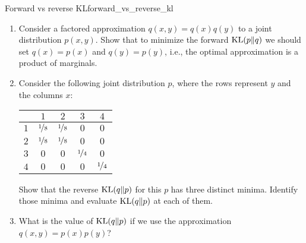 \begin{nexercise}{Forward vs reverse KL}{forward_vs_reverse_kl}
  \begin{enumerate}
    \item Consider a factored approximation $q(x, y) = q(x)q(y)$ to a joint distribution $p(x, y)$.
    Show that to minimize the forward $\KL{p}{q}$ we should set $q(x) = p(x)$ and $q(y) = p(y)$, i.e., the optimal approximation is a product of marginals.

    \item Consider the following joint distribution $p$, where the rows represent $y$ and the columns $x$:

    \begin{center}
      \vspace{5pt}
      \begin{tabular}{l|cccc}
        \toprule
        & $1$ & $2$ & $3$ & $4$ \\
        \midrule
        $1$ & $\nicefrac{1}{8}$ & $\nicefrac{1}{8}$ & $0$ & $0$ \\
        $2$ & $\nicefrac{1}{8}$ & $\nicefrac{1}{8}$ & $0$ & $0$ \\
        $3$ & $0$ & $0$ & $\nicefrac{1}{4}$ & $0$ \\
        $4$ & $0$ & $0$ & $0$ & $\nicefrac{1}{4}$ \\
        \bottomrule
      \end{tabular}
      \vspace{5pt}
    \end{center}

    Show that the reverse $\KL{q}{p}$ for this $p$ has three distinct minima.
    Identify those minima and evaluate $\KL{q}{p}$ at each of them.

    \item What is the value of $\KL{q}{p}$ if we use the approximation ${q(x, y) = p(x) p(y)}$?
  \end{enumerate}
\end{nexercise}

